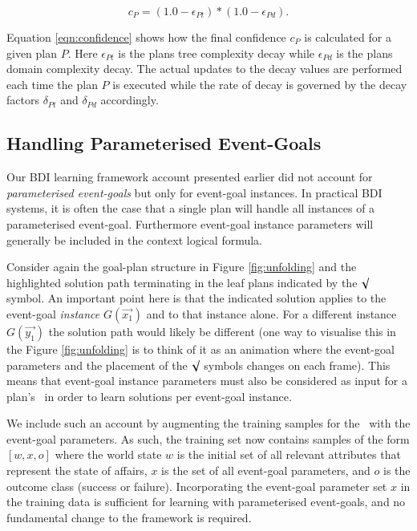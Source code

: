 \begin{equation}\label{eqn:confidence}   
c_P = (1.0 - \epsilon_{Pt}) * (1.0 - \epsilon_{Pd}).
\end{equation}

Equation \ref{eqn:confidence} shows how the final confidence $c_P$ is calculated for a given plan $P$. Here $\epsilon_{Pt}$ is the plans tree complexity decay while $\epsilon_{Pd}$ is the plans domain complexity decay. The actual updates to the decay values are performed each time the plan $P$ is executed while the rate of decay is governed by the decay factors $\delta_{Pt}$ and $\delta_{Pd}$ accordingly.


\subsection{Handling Parameterised Event-Goals}

Our BDI learning framework account presented earlier \cite{Airiau:IJAT:09,Singh:AAMAS10} did not account for \textit{parameterised event-goals} but only for event-goal instances. In practical BDI systems, it is often the case that a single plan will handle all instances of a parameterised event-goal. Furthermore event-goal instance parameters will generally be included in the context logical formula. 

Consider again the goal-plan structure in Figure \ref{fig:unfolding} and the highlighted solution path terminating in the leaf plans indicated by the $\surd$ symbol. An important point here is that the indicated solution applies to the event-goal \textit{instance} $G(\vec{x_1})$ and to that instance alone. For a different instance $G(\vec{y_1})$ the solution path would likely be different (one way to visualise this in the Figure \ref{fig:unfolding} is to think of it as an animation where the event-goal parameters and the placement of the $\surd$ symbols changes on each frame).  This means that event-goal instance parameters must also be considered as input for a plan's \dt\ in order to learn solutions per event-goal instance.

We include such an account by augmenting the training samples for the \dt\ with the event-goal parameters. As such, the training set now contains samples of the form $[w,x,o]$ where the world state $w$ is the initial set of all relevant attributes that represent the state of affairs, $x$ is the set of all event-goal parameters, and $o$ is the outcome class (success or failure). Incorporating the event-goal parameter set $x$ in the training data is sufficient for learning with parameterised event-goals, and no fundamental change to the framework is required.

